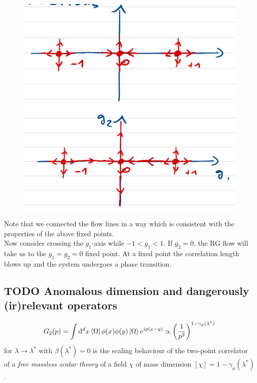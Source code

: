 \begin{enumerate}
\begin{figure}[h!]
	\centering
	\includegraphics[width=0.35\linewidth]{gfx/RGtoy2}
	\; \longrightarrow \; 
	\includegraphics[width=0.35\linewidth]{gfx/RGtoy3}
	\caption{}
	\label{fig:rgtoy2}
\end{figure}
Note that we connected the flow lines in a way which is consistent with the properties of the above fixed points.\\
Now consider crossing the $g_1$-axis while $-1 < g_1 < 1$. If $g_2=0$, the RG flow will take us to the $g_1=g_2=0$ fixed point. At a fixed point the correlation length blows up and the system undergoes a phase transition.


 
\end{enumerate}

\subsection{TODO Anomalous dimension and dangerously (ir)relevant operators}
\begin{equation}
G_2(p) = \int \mathrm{d}^d x \bra{\Omega}\phi(x) \phi(y) \ket{\Omega} e^{ip(x-y)}\propto \left(\frac{1}{p^2}\right)^{1-\gamma_\phi(\lambda^*)}
\end{equation}
for $\lambda\rightarrow\lambda^*$ with $\beta(\lambda^*)=0$ is the scaling behaviour of the two-point correlator of a \emph{free massless scalar theory} of a field $\chi$ of mass dimension $[\chi]=1-\gamma_{\phi}(\lambda^*)$.
